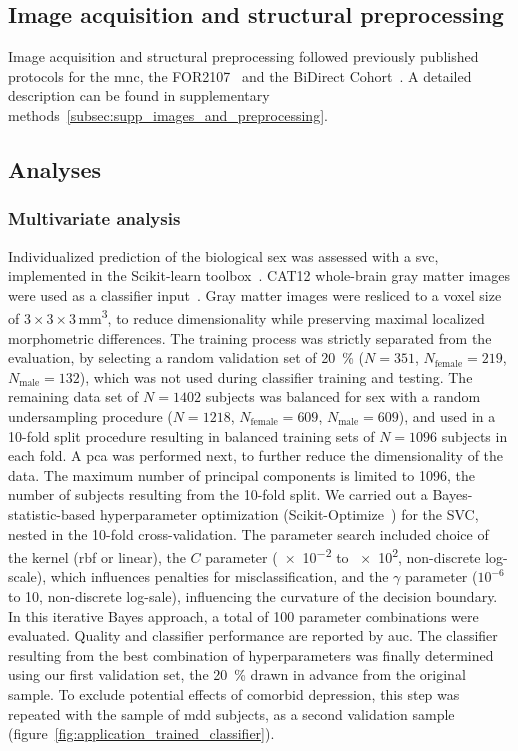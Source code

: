 \documentclass{article}
\begin{document}
    \subsection{Image acquisition and structural preprocessing}
    Image acquisition and structural preprocessing followed previously published protocols for the \ac{mnc}\cite{Dannlowski2015b, Dannlowski2015a}, the FOR2107~\cite{Vogelbacher2018} and the BiDirect Cohort~\cite{Teuber2017}. A detailed description can be found in supplementary methods~\ref{subsec:supp_images_and_preprocessing}.

    \subsection{Analyses}

    \subsubsection{Multivariate analysis}
    Individualized prediction of the biological sex was assessed with a \ac{svc}, implemented in the Scikit-learn toolbox~\cite{Pedregosa2012}. CAT12 whole-brain gray matter images were used as a classifier input~\cite{Gaser}. Gray matter images were resliced to a voxel size of $3 \times 3 \times 3$\,\si{\cubic\milli\meter}, to reduce dimensionality while preserving maximal localized morphometric differences.
    The training process was strictly separated from the evaluation, by selecting a random validation set of \SI{20}{\percent} ($N = 351$, $N_\text{female} = 219$, $N_\text{male} = 132$), which was not used during classifier training and testing. The remaining data set of $N = 1402$ subjects was balanced for sex with a random undersampling procedure ($N = 1218$, $N_\text{female} = 609$, $N_\text{male} = 609$), and used in a 10-fold split procedure resulting in balanced training sets of $N=1096$ subjects in each fold.
    A \ac{pca} was performed next, to further reduce the dimensionality of the data. The maximum number of principal components is limited to 1096, the number of subjects resulting from the 10-fold split. We carried out a Bayes-statistic-based hyperparameter optimization (Scikit-Optimize~\cite{Head2018}) for the SVC, nested in the 10-fold cross-validation. The parameter search included choice of the kernel (\ac{rbf} or linear), the $C$ parameter (\num{e-2} to \num{e2}, non-discrete log-scale), which influences penalties for misclassification, and the $\gamma$ parameter ($10^{-6}$ to 10, non-discrete log-sale), influencing the curvature of the decision boundary. In this iterative Bayes approach, a total of 100 parameter combinations were evaluated. Quality and classifier performance are reported by \ac{auc}. The classifier resulting from the best combination of hyperparameters was finally determined using our first validation set, the \SI{20}{\percent} drawn in advance from the original sample. To exclude potential effects of comorbid depression, this step was repeated with the sample of \ac{mdd} subjects, as a second validation sample (figure~\ref{fig:application_trained_classifier}).
\end{document}
